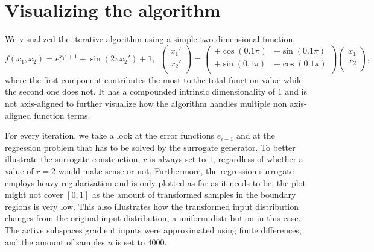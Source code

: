 \documentclass[
  a4paper,  %
  twoside,  %
  bibliography=totoc,
  headsepline,
  cleardoublepage=empty,
  parskip=half,
  draft=false
]{scrbook}
\begin{document}
\newpage
\section{Visualizing the algorithm}

We visualized the iterative algorithm using a simple two-dimensional function,
\begin{equation}
f(x_1, x_2)=e^{x_1' + 1} + \sin(2 \pi x_2') + 1, ~~ \begin{pmatrix}
    x_1' \\ x_2'
    \\
  \end{pmatrix} = \begin{pmatrix}
    +\cos(0.1 \pi) & -\sin(0.1 \pi)\\
    +\sin(0.1 \pi) & +\cos(0.1 \pi)
    \\
  \end{pmatrix}\begin{pmatrix}
    x_1 \\ x_2
    \\
  \end{pmatrix},
\end{equation}
where the first component contributes the most to the total function value while the second one does not.
It has a compounded intrinsic dimensionality of $1$ and is not axis-aligned to further visualize how the algorithm handles multiple non axis-aligned function terms.

For every iteration, we take a look at the error functions $e_{i - 1}$ and at the regression problem that has to be solved by the surrogate generator.
To better illustrate the surrogate construction, $r$ is always set to $1$, regardless of whether a value of $r=2$ would make sense or not.
Furthermore, the regression surrogate employs heavy regularization and is only plotted as far as it needs to be, \ie the plot might not cover $[0,1]$ as the amount of transformed samples in the boundary regions is very low.
This also illustrates how the transformed input distribution changes from the original input distribution, a uniform distribution in this case.
The active subspaces gradient inputs were approximated using finite differences, and the amount of samples $n$ is set to $4000$.
\end{document}
